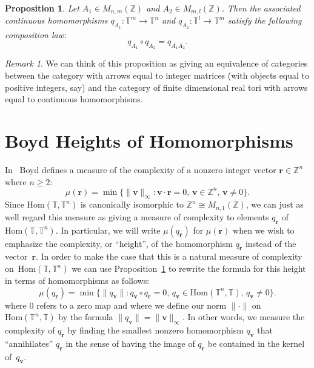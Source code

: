 \documentclass[12pt]{amsart}
\theoremstyle{plain}
\newtheorem{proposition}[theorem]{Proposition}
\theoremstyle{definition}
\theoremstyle{remark}
\newtheorem{remark}[theorem]{Remark}
\numberwithin{theorem}{section}
\numberwithin{equation}{section} %
\newcommand{\bZ}{{\mathbb{Z}}}
\newcommand{\mb}{\mathbf}
\newcommand{\torus}{{\mathbb{T}}}
\begin{document}
\begin{proposition} \label{comp_prop}
Let  $A_1 \in M_{n, m}(\bZ)$ and $A_2 \in M_{m, l}(\bZ)$. Then the associated
continuous homomorphisms $q_{A_1} \colon \torus^m \to \torus^n$ and $q_{A_2} \colon \torus^l \to \torus^m$
satisfy the following composition law:
$$
q_{A_1} \circ q_{A_2} = q_{A_1 A_2}.
$$
\end{proposition}

\begin{remark}
We can think of this proposition as giving an equivalence of categories between the category with 
arrows equal to integer matrices (with objects equal to positive integers, say)  and the category of finite dimensional real tori with arrows equal to continuous homomorphisms.
\end{remark}






\section{Boyd Heights of Homomorphisms} \label{height_section}

In~\citep[p.~118]{boyd1981} Boyd defines a measure of the complexity of a nonzero integer vector $\mb r \in \bZ^n$
where $n\ge 2$:
$$
\mu(\mb r) =  \min  \{ \| \mb v \|_\infty \colon \mb v \cdot  \mb r = 0,  \, \mb v \in \bZ^n, \,  \mb v \ne 0 \}.
$$
Since $\mathrm{Hom}(\torus, \torus^n)$ is canonically isomorphic to $\bZ^n \cong M_{n, 1}(\bZ)$, we can 
just as well regard
this measure as giving a measure of complexity to elements $q_{\mb r}$ of $\mathrm{Hom}(\torus, \torus^n)$.
In particular, we will write $\mu\left(q_{\mb r}\right)$ for $\mu(\mb r)$ when we wish to emphasize the
complexity, or ``height'', of the homomorphism $q_{\mb r}$ instead of the vector~$\mb r$. 
In order to make the case that this is a natural measure of complexity on~$\mathrm{Hom}(\torus, \torus^n)$ we can use Proposition~\ref{comp_prop} to rewrite the formula for this height in terms of homomorphisms as follows:
$$
\mu\left(q_{\mb r}\right) =  \min  \{ \| q_{\mb v}  \| \colon q_{\mb v} \circ q_{\mb r}= 0,  \, q_{\mb v} \in \mathrm{Hom}(\torus^n, \torus), \,  q_{\mb v} \ne 0 \}.
$$
where $0$ refers to a zero map and where we define our norm $\| \cdot \|$ on  $\mathrm{Hom}(\torus^n, \torus)$
by the formula $\| q_{\mb v} \| = \| \mb v \|_{\infty}$.
In other words, we measure the complexity of $q_{\mb r}$ by finding the smallest nonzero
homomorphism $q_{\mb v}$ that ``annihilates'' %
$q_{\mb r}$ in the sense of having the image of $q_{\mb r}$
be contained in the kernel of~$q_{\mb v}$.
\end{document}
